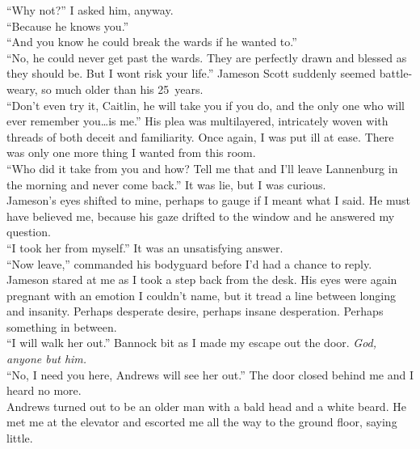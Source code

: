 \documentclass[a5paper]{scrartcl}
\begin{document}
\enquote{Why not?} I asked him, anyway.\\


\enquote{Because he knows you.}\\


\enquote{And you know he could break the wards if he wanted to.}\\


\enquote{No, he could never get past the wards. They are perfectly drawn and blessed as they should be. But I wont risk your life.} Jameson Scott suddenly seemed battle-weary, so much older than his 25~years.\\


\enquote{Don't even try it, Caitlin,  he will take you if you do, and the only one who will ever remember you\dots is me.} His plea was multilayered, intricately woven with threads of both deceit and familiarity. Once again, I was put ill at ease. There was only one more thing I wanted from this room.\\


\enquote{Who did it take from you and how?  Tell me that and I'll leave Lannenburg in the morning and never come back.} It was lie, but I was curious.\\


Jameson's eyes shifted to mine, perhaps to gauge if I meant what I said. He must have believed me, because his gaze drifted to the window and he answered my question.\\


\enquote{I took her from myself.} It was an unsatisfying answer.\\


\enquote{Now leave,} commanded his bodyguard before I'd had a chance to reply. Jameson stared at me as I took a step back from the desk. His eyes were again pregnant with an emotion I couldn't name, but it tread a line between longing and insanity.  Perhaps desperate desire, perhaps insane desperation. Perhaps something in between.\\


\enquote{I will walk her out.} Bannock bit as I made my escape out the door. \textit{God, anyone but him.}
\\


\enquote{No, I need you here, Andrews will see her out.} The door closed behind me and I heard no more.\\


Andrews turned out to be an older man with a bald head and a white beard. He met me at the elevator and escorted me all the way to the ground floor, saying little.\\
\end{document}

